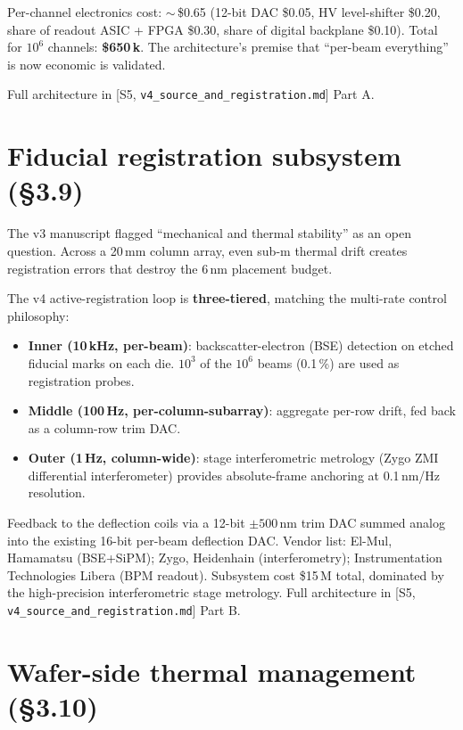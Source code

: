 \documentclass[11pt,letterpaper]{article}
\begin{document}
Per-channel electronics cost: $\sim$\,\$0.65 (12-bit DAC \$0.05, HV level-shifter \$0.20, share of readout ASIC + FPGA \$0.30, share of digital backplane \$0.10). Total for $10^6$ channels: \textbf{\$650\,k}. The architecture's premise that ``per-beam everything'' is now economic is validated.

Full architecture in [S5, \texttt{v4\_source\_and\_registration.md}] Part A.

\section{Fiducial registration subsystem (\S 3.9)}

The v3 manuscript flagged ``mechanical and thermal stability'' as an open question. Across a 20\,mm column array, even sub-\textmu m thermal drift creates registration errors that destroy the 6\,nm placement budget.

The v4 active-registration loop is \textbf{three-tiered}, matching the multi-rate control philosophy:

\begin{itemize}[leftmargin=1.6em]
  \item \textbf{Inner (10\,kHz, per-beam)}: backscatter-electron (BSE) detection on etched fiducial marks on each die. $10^3$ of the $10^6$ beams (0.1\,\%) are used as registration probes.
  \item \textbf{Middle (100\,Hz, per-column-subarray)}: aggregate per-row drift, fed back as a column-row trim DAC.
  \item \textbf{Outer (1\,Hz, column-wide)}: stage interferometric metrology (Zygo ZMI differential interferometer) provides absolute-frame anchoring at 0.1\,nm/Hz resolution.
\end{itemize}

Feedback to the deflection coils via a 12-bit $\pm 500$\,nm trim DAC summed analog into the existing 16-bit per-beam deflection DAC. Vendor list: El-Mul, Hamamatsu (BSE+SiPM); Zygo, Heidenhain (interferometry); Instrumentation Technologies Libera (BPM readout). Subsystem cost \$15\,M total, dominated by the high-precision interferometric stage metrology. Full architecture in [S5, \texttt{v4\_source\_and\_registration.md}] Part B.

\section{Wafer-side thermal management (\S 3.10)}
\end{document}
